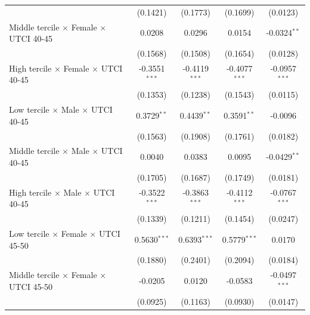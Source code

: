 \begin{table}[htbp]
\begin{tabular}{lcccc}
                                                           & (0.1421)        & (0.1773)            & (0.1699)          & (0.0123)\\   
      Middle tercile $\times$ Female $\times$ UTCI 40-45   & 0.0208          & 0.0296              & 0.0154            & -0.0324$^{**}$\\   
                                                           & (0.1568)        & (0.1508)            & (0.1654)          & (0.0128)\\   
      High tercile $\times$ Female $\times$ UTCI 40-45     & -0.3551$^{***}$ & -0.4119$^{***}$     & -0.4077$^{***}$   & -0.0957$^{***}$\\   
                                                           & (0.1353)        & (0.1238)            & (0.1543)          & (0.0115)\\   
      Low tercile $\times$ Male $\times$ UTCI 40-45        & 0.3729$^{**}$   & 0.4439$^{**}$       & 0.3591$^{**}$     & -0.0096\\   
                                                           & (0.1563)        & (0.1908)            & (0.1761)          & (0.0182)\\   
      Middle tercile $\times$ Male $\times$ UTCI 40-45     & 0.0040          & 0.0383              & 0.0095            & -0.0429$^{**}$\\   
                                                           & (0.1705)        & (0.1687)            & (0.1749)          & (0.0181)\\   
      High tercile $\times$ Male $\times$ UTCI 40-45       & -0.3522$^{***}$ & -0.3863$^{***}$     & -0.4112$^{***}$   & -0.0767$^{***}$\\   
                                                           & (0.1339)        & (0.1211)            & (0.1454)          & (0.0247)\\   
      Low tercile $\times$ Female $\times$ UTCI 45-50      & 0.5630$^{***}$  & 0.6393$^{***}$      & 0.5779$^{***}$    & 0.0170\\   
                                                           & (0.1880)        & (0.2401)            & (0.2094)          & (0.0184)\\   
      Middle tercile $\times$ Female $\times$ UTCI 45-50   & -0.0205         & 0.0120              & -0.0583           & -0.0497$^{***}$\\   
                                                           & (0.0925)        & (0.1163)            & (0.0930)          & (0.0147)\\   

\end{tabular}
\end{table}
